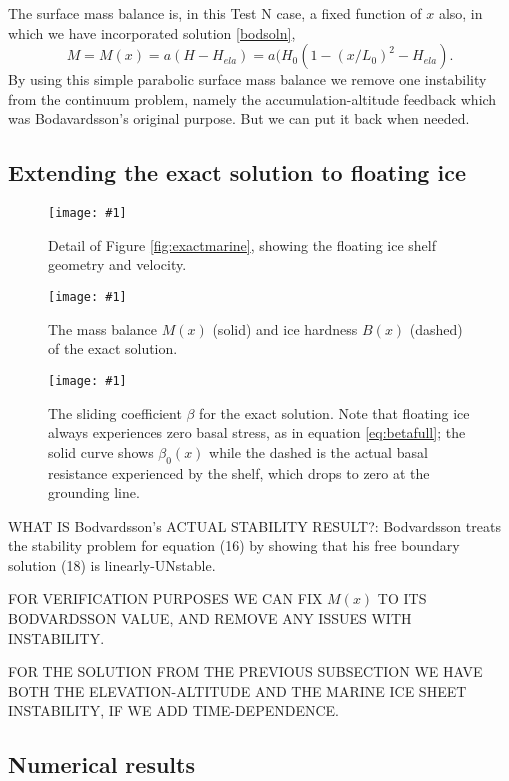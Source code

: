 \documentclass[twocolumn,letterpaper]{igs}
\newcommand{\onecol}[1]{\texttt{[image: \#1]}}
\begin{document}
The surface mass balance is, in this Test N case, a fixed function of $x$ also, in which we have incorporated solution \eqref{bodsoln},
	$$M = M(x) = a(H-H_{ela}) = a(H_0(1 - (x/L_0)^2 - H_{ela}).$$
By using this simple parabolic surface mass balance we remove one instability from the continuum problem, namely the accumulation-altitude feedback which was Bodavardsson's original purpose.  But we can put it back when needed.

\subsection*{Extending the exact solution to floating ice}

\begin{figure}[ht]
\onecol{exactmarine-geometry-detail}
\caption{Detail of Figure \ref{fig:exactmarine}, showing the floating ice shelf geometry and velocity.} \label{fig:exactmarine-detail}
\end{figure}

\begin{figure}[ht]
\onecol{exactmarine-M-B}
\caption{The mass balance $M(x)$ (solid) and ice hardness $B(x)$ (dashed) of the exact solution.} \label{fig:exactMB}
\end{figure}

\begin{figure}[ht]
\onecol{exactmarine-beta}
\caption{The sliding coefficient $\beta$ for the exact solution.  Note that floating ice always experiences zero basal stress, as in equation \eqref{eq:betafull}; the solid curve shows $\beta_0(x)$ while the dashed is the actual basal resistance experienced by the shelf, which drops to zero at the grounding line.} \label{fig:exactbeta}
\end{figure}


WHAT IS Bodvardsson's ACTUAL STABILITY RESULT?:  Bodvardsson treats the stability problem for equation (16) by showing that his free boundary solution (18) is linearly-UNstable.

FOR VERIFICATION PURPOSES WE CAN FIX $M(x)$ TO ITS BODVARDSSON VALUE, AND REMOVE ANY ISSUES WITH INSTABILITY.

FOR THE SOLUTION FROM THE PREVIOUS SUBSECTION WE HAVE BOTH THE ELEVATION-ALTITUDE AND THE MARINE ICE SHEET INSTABILITY, IF WE ADD TIME-DEPENDENCE.



\subsection*{Numerical results}
\end{document}
